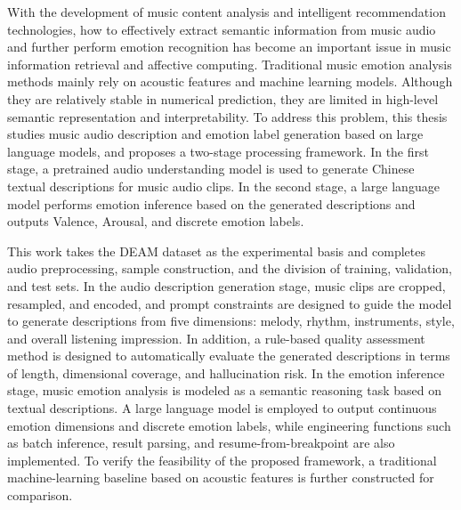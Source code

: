 

\begin{abstracten}
With the development of music content analysis and intelligent recommendation technologies, how to effectively extract semantic information from music audio and further perform emotion recognition has become an important issue in music information retrieval and affective computing. Traditional music emotion analysis methods mainly rely on acoustic features and machine learning models. Although they are relatively stable in numerical prediction, they are limited in high-level semantic representation and interpretability. To address this problem, this thesis studies music audio description and emotion label generation based on large language models, and proposes a two-stage processing framework. In the first stage, a pretrained audio understanding model is used to generate Chinese textual descriptions for music audio clips. In the second stage, a large language model performs emotion inference based on the generated descriptions and outputs Valence, Arousal, and discrete emotion labels.

This work takes the DEAM dataset as the experimental basis and completes audio preprocessing, sample construction, and the division of training, validation, and test sets. In the audio description generation stage, music clips are cropped, resampled, and encoded, and prompt constraints are designed to guide the model to generate descriptions from five dimensions: melody, rhythm, instruments, style, and overall listening impression. In addition, a rule-based quality assessment method is designed to automatically evaluate the generated descriptions in terms of length, dimensional coverage, and hallucination risk. In the emotion inference stage, music emotion analysis is modeled as a semantic reasoning task based on textual descriptions. A large language model is employed to output continuous emotion dimensions and discrete emotion labels, while engineering functions such as batch inference, result parsing, and resume-from-breakpoint are also implemented. To verify the feasibility of the proposed framework, a traditional machine-learning baseline based on acoustic features is further constructed for comparison.


\end{abstracten}
